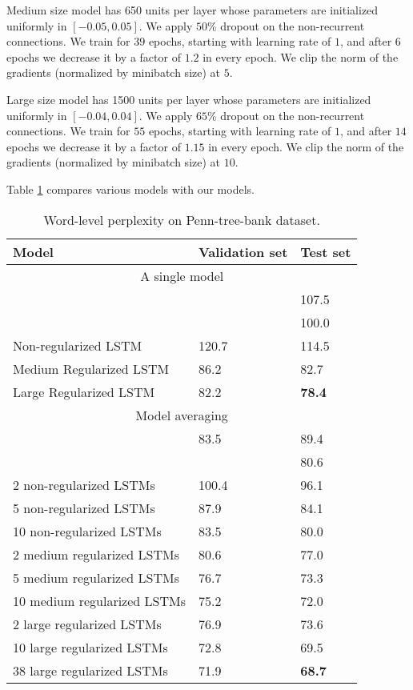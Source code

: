 \documentclass{article}
\begin{document}
Medium size model has 650 units per layer
whose parameters are initialized uniformly in $[-0.05,
  0.05]$. We apply $50\%$ dropout on the non-recurrent connections. We
train for $39$ epochs, starting with learning rate of $1$, and after
$6$ epochs we decrease it by a factor of $1.2$ in every epoch. We
clip the norm of the gradients
(normalized by minibatch size) at $5$. 


Large size model has 1500 units per layer
whose parameters are initialized uniformly in $[-0.04,
  0.04]$. We apply $65\%$ dropout on the non-recurrent connections. We
train for $55$ epochs, starting with learning rate of $1$, and after
$14$ epochs we decrease it by a factor of $1.15$ in every epoch. We
clip the norm of the gradients
(normalized by minibatch size) at $10$. 


Table \ref{tab:ptb} compares various models with our models.

\begin{table}[t]
  \small
  \centering
  \renewcommand{\arraystretch}{1.15}
  \begin{tabular}{lll}
    \hline
     Model & Validation set & Test set \\
    \hline
    \multicolumn{3}{c}{A single model} \\
    \hline
    \cite{pascanu2013construct} & & 107.5 \\
    \cite{chenglanguage} & & 100.0 \\
    Non-regularized LSTM & 120.7 & 114.5 \\
    Medium Regularized LSTM & 86.2 & 82.7 \\
    Large Regularized LSTM & 82.2 & {\bf 78.4} \\
    \hline
    \multicolumn{3}{c}{Model averaging} \\
    \hline
    \cite{mikolov2012statistical} & 83.5 & 89.4 \\
    \cite{chenglanguage} & & 80.6 \\
    2 non-regularized LSTMs & 100.4 & 96.1 \\
    5 non-regularized LSTMs & 87.9 & 84.1 \\
    10 non-regularized LSTMs & 83.5 & 80.0 \\
    2 medium regularized LSTMs & 80.6 & 77.0 \\
    5 medium regularized LSTMs & 76.7 & 73.3 \\
    10 medium regularized LSTMs & 75.2 & 72.0 \\
    2 large regularized LSTMs & 76.9 & 73.6 \\
    10 large regularized LSTMs & 72.8 & 69.5 \\
    38 large regularized LSTMs & 71.9 & {\bf 68.7} \\
    \hline
  \end{tabular}
  \caption{Word-level perplexity on Penn-tree-bank dataset.}
  \label{tab:ptb}
\end{table}
\end{document}
